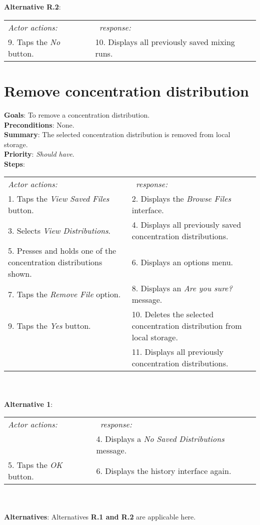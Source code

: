     \\
         \\\textbf{Alternative R.2}: \\
        \begin{tabular}{ p{} p{} }
  	\emph{Actor actions:} & \emph{\projectname\ response:} \\
    9. Taps the \emph{No} button. & 10. Displays all previously saved mixing runs. \\
    \end{tabular}

\section{Remove concentration distribution}
 \label{removedist}
  \textbf{Goals}: To remove a concentration distribution.\\
  \textbf{Preconditions}: None.\\
  \textbf{Summary}: The selected concentration distribution is removed from local storage.\\
  \textbf{Priority}: \emph{Should have}.\\
  \textbf{Steps}: \\
    \begin{tabular}{ p{} p{} }
  	\emph{Actor actions:} & \emph{\projectname\ response:} \\
    1. Taps the \emph{View Saved Files} button. & 2. Displays the \emph{Browse Files} interface.\\
    3. Selects \emph{View Distributions}. & 4. Displays all previously saved concentration distributions.\\
    5. Presses and holds one of the concentration distributions shown. & 6. Displays an options menu. \\
    7. Taps the \emph{Remove File} option. & 8. Displays an \emph{Are you sure?} message.\\
    9. Taps the \emph{Yes} button. & 10. Deletes the selected concentration distribution from local storage. \\
     & 11. Displays all previously concentration distributions.\\
    \end{tabular}
                \\
     \\\textbf{Alternative 1}: \\
    \begin{tabular}{ p{} p{} }
  	\emph{Actor actions:} & \emph{\projectname\ response:} \\
            & 4. Displays a \emph{No Saved Distributions} message. \\
    5. Taps the \emph{OK} button. & 6. Displays the history interface again. \\
    \end{tabular}
    \\
    \\\textbf{Alternatives}: Alternatives \textbf{R.1 and R.2} are applicable here.

